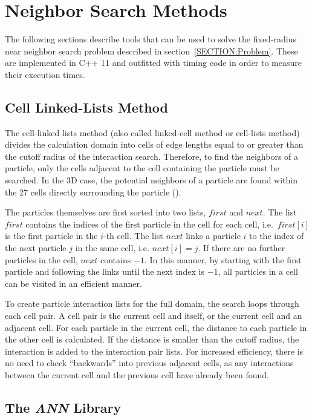\chapter{Neighbor Search Methods}

The following sections describe tools that can be used to solve the fixed-radius near neighbor search problem described in section~\ref{SECTION:Problem}. These are implemented in C++ 11 and outfitted with timing code in order to measure their execution times. 

\section{Cell Linked-Lists Method}

The cell-linked lists method (also called linked-cell method or cell-lists method) divides the calculation domain into cells of edge lengths equal to or greater than the cutoff radius of the interaction search. Therefore, to find the neighbors of a particle, only the cells adjacent to the cell containing the particle must be searched. In the 3D case, the potential neighbors of a particle are found within the 27 cells directly surrounding the particle (\cite{Weygand18}).

The particles themselves are first sorted into two lists, $first$ and $next$. The list $first$ contains the indices of the first particle in the cell for each cell, i.e.\ $first[i]$ is the first particle in the  $i$-th cell.   The list $next$ links a particle $i$ to the index of the next particle $j$ in the same cell, i.e. $next[i] = j$. If there are no further particles in the cell, $next$ contains $-1$. In this manner, by starting with the first particle and following the links until the next index is $-1$, all particles in a cell can be visited in an efficient manner.

To create particle interaction lists for the full domain, the search loops through each cell pair. A cell pair is the current cell and itself, or the current cell and an adjacent cell. For each particle in the current cell, the distance to each particle in the other cell is calculated. If the distance is smaller than the cutoff radius, the interaction is added to the interaction pair lists. For increased efficiency, there is no need to check ``backwards'' into previous adjacent cells, as any interactions between the current cell and the previous cell have already been found.

\section{The {\itshape ANN} Library}
\label{SECTION:ANN}

